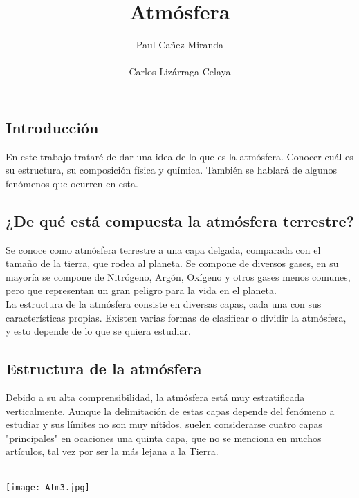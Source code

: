 \documentclass[a4paper]{article}
\title{\Huge Atmósfera}
\author{\LARGE Paul Cañez Miranda \\ \\ \LARGE Carlos Lizárraga Celaya}
\begin{document}
\maketitle

\vspace{0.5cm}

\subsection*{\Large Introducción}

En este trabajo trataré de dar una idea de lo que es la atmósfera. Conocer cuál es su estructura, su composición física y química. También se hablará de algunos fenómenos que ocurren en esta. 

\subsection*{\Large ¿De qué está compuesta la atmósfera terrestre?}
Se conoce como atmósfera terrestre a una capa delgada, comparada con el tamaño de la tierra, que rodea al planeta. Se compone de diversos gases, en su mayoría se compone de Nitrógeno, Argón, Oxígeno y otros gases menos comunes, pero que representan un gran peligro para la vida en el planeta. \\
La estructura de la atmósfera consiste en diversas capas, cada una con sus características propias. 
Existen varias formas de clasificar o dividir la atmósfera, y esto depende de lo que se quiera estudiar. 


\subsection*{\Large Estructura de la atmósfera}

Debido a su alta comprensibilidad, la atmósfera está muy estratificada verticalmente. Aunque la delimitación de estas capas depende del fenómeno a estudiar y sus límites no son muy nítidos, suelen considerarse cuatro capas "principales" en ocaciones una quinta capa, que no se menciona en muchos artículos, tal vez por ser la más lejana a la Tierra. \\ \\ 


\begin{center}
\texttt{[image: Atm3.jpg]}
\end{center}
\vspace{1cm}
\end{document}
